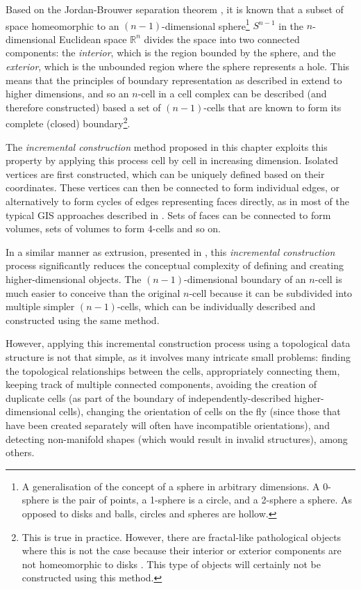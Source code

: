 Based on the Jordan-Brouwer separation theorem \citep{Lebesgue11,Brouwer11}, it is known that a subset of space homeomorphic to an $(n-1)$-dimensional sphere\footnote{A generalisation of the concept of a sphere in arbitrary dimensions.
A 0-sphere is the pair of points, a 1-sphere is a circle, and a 2-sphere a sphere. As opposed to disks and balls, circles and spheres are hollow.} $S^{n-1}$ in the $n$-dimensional Euclidean space $\mathbb{R}^n$ divides the space into two connected components: the \emph{interior}, which is the region bounded by the sphere, and the \emph{exterior}, which is the unbounded region where the sphere represents a hole.
This means that the principles of boundary representation as described in  extend to higher dimensions, and so an $n$-cell in a cell complex can be described (and therefore constructed) based a set of $(n-1)$-cells that are known to form its complete (closed) boundary\footnote{This is true in practice.
However, there are fractal-like pathological objects where this is not the case because their interior or exterior components are not homeomorphic to disks \citep{Alexander24}.
This type of objects will certainly not be constructed using this method.}.

The \emph{incremental construction} method proposed in this chapter exploits this property by applying this process cell by cell in increasing dimension.
Isolated vertices are first constructed, which can be uniquely defined based on their coordinates.
These vertices can then be connected to form individual edges, or alternatively to form cycles of edges representing faces directly, as in most of the typical GIS approaches described in .
Sets of faces can be connected to form volumes, sets of volumes to form 4-cells and so on.

In a similar manner as extrusion, presented in , this \emph{incremental construction} process significantly reduces the conceptual complexity of defining and creating higher-dimensional objects.
The $(n-1)$-dimensional boundary of an $n$-cell is much easier to conceive than the original $n$-cell because it can be subdivided into multiple simpler $(n-1)$-cells, which can be individually described and constructed using the same method.

However, applying this incremental construction process using a topological data structure is not that simple, as it involves many intricate small problems: finding the topological relationships between the cells, appropriately connecting them, keeping track of multiple connected components, avoiding the creation of duplicate cells (as part of the boundary of independently-described higher-dimensional cells), changing the orientation of cells on the fly (since those that have been created separately will often have incompatible orientations), and detecting non-manifold shapes (which would result in invalid structures), among others.

